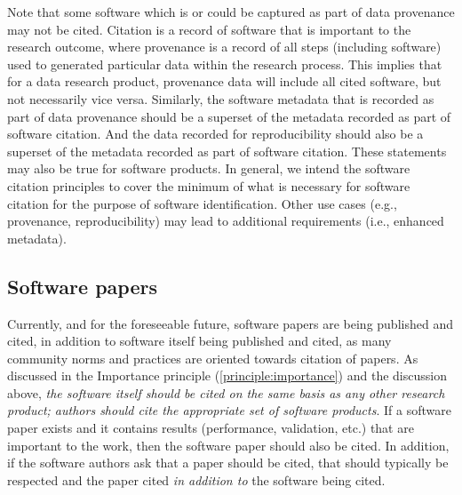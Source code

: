 \documentclass[11pt, oneside]{amsart}
\newcommand{\dmnote}[1]{ {\textcolor{purple} { ***DM: #1 }}} %
\newcommand{\ssnote}[1]{ {\textcolor{bondiblue} { ***SS: #1}}} %
\begin{document}
Note that some software which is or could be captured as part of data provenance may not be cited.
Citation is a record of software that is important to the research outcome, where provenance is a record of all steps (including software) used to generated particular data within the research process.
This implies that for a data research product, provenance data will include all cited software, but not necessarily vice versa.
Similarly, the software metadata that is recorded as part of data provenance should be a superset of the metadata recorded as part of software citation.
And the data recorded for reproducibility should also be a superset of the metadata recorded as part of software citation.
These statements may also be true for software products.
In general, we intend the software citation principles to cover the minimum of what is necessary for software citation for the purpose of software identification.
Other use cases (e.g., provenance, reproducibility) may lead to additional requirements (i.e., enhanced metadata).

\subsection{Software papers} \label{sec:software_papers}

Currently, and for the foreseeable future, software papers are being published and cited,
in addition to software itself being published and cited, as many community norms and practices are
oriented towards citation of papers.
As discussed in the Importance principle (\ref{principle:importance}) and the discussion above, \textit{the software
itself should be cited on the same basis as any other research product; authors should cite the appropriate set of software products}.
If a software paper exists and it contains results (performance, validation, etc.) that are
important to the work, then the software paper should also be cited.
In addition, if the software authors ask that a paper should be cited, that should typically be respected and the paper cited \textit{in addition to} the software being cited.
\end{document}

